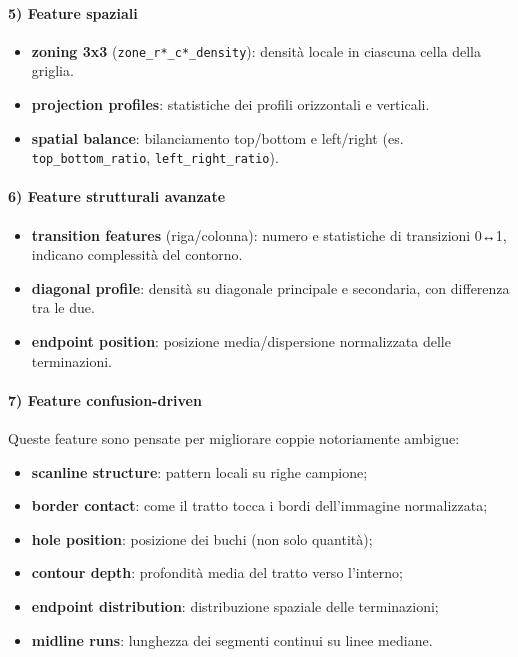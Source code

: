 \documentclass[a4paper,12pt]{article}
\begin{document}
\paragraph{5) Feature spaziali}
\begin{itemize}[leftmargin=1.5em]
  \item \textbf{zoning 3x3} (\texttt{zone\_r*\_c*\_density}): densità locale in ciascuna cella della griglia.
  \item \textbf{projection profiles}: statistiche dei profili orizzontali e verticali.
  \item \textbf{spatial balance}: bilanciamento top/bottom e left/right (es. \texttt{top\_bottom\_ratio}, \texttt{left\_right\_ratio}).
\end{itemize}

\paragraph{6) Feature strutturali avanzate}
\begin{itemize}[leftmargin=1.5em]
  \item \textbf{transition features} (riga/colonna): numero e statistiche di transizioni 0↔1, indicano complessità del contorno.
  \item \textbf{diagonal profile}: densità su diagonale principale e secondaria, con differenza tra le due.
  \item \textbf{endpoint position}: posizione media/dispersione normalizzata delle terminazioni.
\end{itemize}

\paragraph{7) Feature confusion-driven}
Queste feature sono pensate per migliorare coppie notoriamente ambigue:
\begin{itemize}[leftmargin=1.5em]
  \item \textbf{scanline structure}: pattern locali su righe campione;
  \item \textbf{border contact}: come il tratto tocca i bordi dell'immagine normalizzata;
  \item \textbf{hole position}: posizione dei buchi (non solo quantità);
  \item \textbf{contour depth}: profondità media del tratto verso l'interno;
  \item \textbf{endpoint distribution}: distribuzione spaziale delle terminazioni;
  \item \textbf{midline runs}: lunghezza dei segmenti continui su linee mediane.
\end{itemize}
\end{document}
